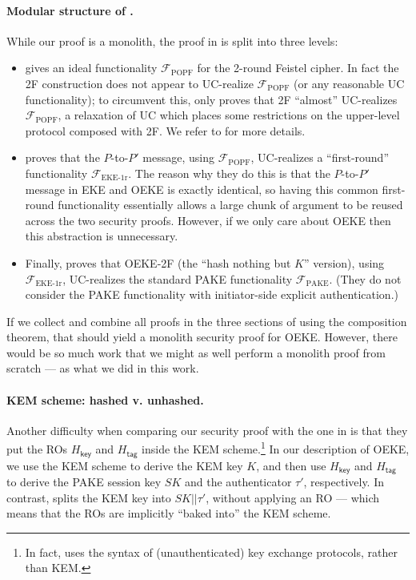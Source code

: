 \documentclass{article}
\theoremstyle{plain}
\theoremstyle{definition}
\theoremstyle{remark}
\newcommand{\func}{\mathcal{F}}
\newcommand{\Hkey}{H_\mathsf{key}}
\newcommand{\Htag}{H_\mathsf{tag}}
\begin{document}
\paragraph{Modular structure of \cite{EC:JanRoyXu25}.}
While our proof is a monolith, the proof in \cite{EC:JanRoyXu25} is split into three levels:
\begin{itemize}
  \item \cite[Section~4]{EC:JanRoyXu25} gives an ideal functionality $\func_\text{POPF}$ for the 2-round Feistel cipher. In fact the 2F construction does not appear to UC-realize $\func_\text{POPF}$ (or any reasonable UC functionality); to circumvent this, \cite{EC:JanRoyXu25} only proves that 2F ``almost'' UC-realizes $\func_\text{POPF}$, a relaxation of UC which places some restrictions on the upper-level protocol composed with 2F. We refer to \cite[Section~4]{EC:JanRoyXu25} for more details.
  \item \cite[Section~5.1]{EC:JanRoyXu25} proves that the $P$-to-$P'$ message, using $\func_\text{POPF}$, UC-realizes a ``first-round'' functionality $\func_\text{EKE-1r}$. The reason why they do this is that the $P$-to-$P'$ message in EKE and OEKE is exactly identical, so having this common first-round functionality essentially allows a large chunk of argument to be reused across the two security proofs. However, if we only care about OEKE then this abstraction is unnecessary.
  \item Finally, \cite[Section~5.3]{EC:JanRoyXu25} proves that OEKE-2F (the ``hash nothing but $K$'' version), using $\func_\text{EKE-1r}$, UC-realizes the standard PAKE functionality $\func_\text{PAKE}$. (They do not consider the PAKE functionality with initiator-side explicit authentication.)
\end{itemize}
If we collect and combine all proofs in the three sections of \cite{EC:JanRoyXu25} using the composition theorem, that should yield a monolith security proof for OEKE. However, there would be so much work that we might as well perform a monolith proof from scratch --- as what we did in this work.

\paragraph{KEM scheme: hashed v. unhashed.}
Another difficulty when comparing our security proof with the one in \cite{EC:JanRoyXu25} is that they put the ROs $\Hkey$ and $\Htag$ inside the KEM scheme.\footnote{In fact, \cite{EC:JanRoyXu25} uses the syntax of (unauthenticated) key exchange protocols, rather than KEM.} In our description of OEKE, we use the KEM scheme to derive the KEM key $K$, and then use $\Hkey$ and $\Htag$ to derive the PAKE session key $SK$ and the authenticator $\tau'$, respectively. In contrast, \cite{EC:JanRoyXu25} splits the KEM key into $SK||\tau'$, without applying an RO --- which means that the ROs are implicitly ``baked into'' the KEM scheme.
\end{document}
